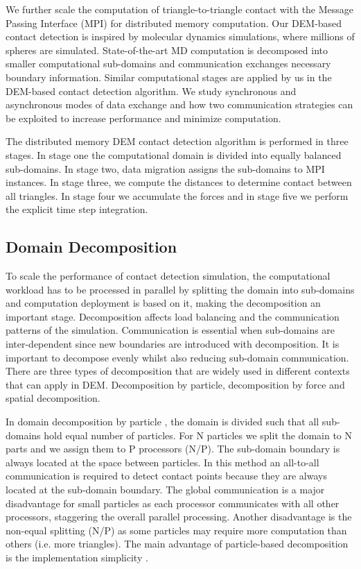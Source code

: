 \documentclass[times,12pt]{article}
\begin{document}
We further scale the computation of triangle-to-triangle contact with the Message Passing Interface (MPI) \cite{Forum:1994:MMI:898758} for distributed memory computation. Our DEM-based contact detection is inspired by molecular dynamics simulations, where millions of spheres are simulated. State-of-the-art MD computation is decomposed into smaller computational sub-domains and communication exchanges necessary boundary information. Similar computational stages are applied by us in the DEM-based contact detection algorithm. We study synchronous and asynchronous modes of data exchange and how two communication strategies can be exploited to increase performance and minimize computation.

The distributed memory DEM contact detection algorithm is performed in three stages. In stage one the computational domain is divided into equally balanced sub-domains. In stage two, data migration assigns the sub-domains to MPI instances. In stage three, we compute the distances to determine contact between all triangles. In stage four we accumulate the forces and in stage five we perform the explicit time step integration.

\subsection{Domain Decomposition}

To scale the performance of contact detection simulation, the computational workload has to be processed in parallel by splitting the domain into sub-domains and computation deployment is based on it, making the decomposition an important stage. Decomposition affects load balancing and the communication patterns of the simulation. Communication is essential when sub-domains are inter-dependent since new boundaries are introduced with decomposition. It is important to decompose evenly whilst also reducing sub-domain communication. There are three types of decomposition that are widely used in different contexts \cite{Eckhardt2014, Plimpton1995} that can apply in DEM. Decomposition by particle, decomposition by force and spatial decomposition. 

In domain decomposition by particle \cite{koziara2011}, the domain is divided such that all sub-domains hold equal number of particles. For N particles we split the domain to N parts and we assign them to P processors (N/P). The sub-domain boundary is always located at the space between particles. In this method an all-to-all communication is required to detect contact points because they are always located at the sub-domain boundary. The global communication is a major disadvantage for small particles as each processor communicates with all other processors, staggering the overall parallel processing. Another disadvantage is the non-equal splitting (N/P) as some particles may require more computation than others (i.e. more triangles). The main advantage of particle-based decomposition is the implementation simplicity \cite{Plimpton1995}.
\end{document}
